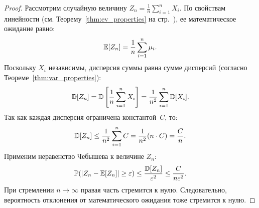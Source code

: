 \begin{proof}
Рассмотрим случайную величину $Z_n = \frac{1}{n}\sum_{i=1}^n X_i$.
По свойствам линейности (см. Теорему~\ref{thm:ev_properties} на стр.~\pageref{thm:ev_properties}), ее математическое ожидание равно:
\[
\mathbb{E}[Z_n] = \frac{1}{n}\sum_{i=1}^n \mu_i.
\]
Поскольку $X_i$ независимы, дисперсия суммы равна сумме дисперсий (согласно Теореме~\ref{thm:var_properties}):
\[
\mathbb{D}[Z_n] = \mathbb{D}\left[\frac{1}{n}\sum_{i=1}^n X_i\right] = \frac{1}{n^2} \sum_{i=1}^n \mathbb{D}[X_i].
\]
Так как каждая дисперсия ограничена константой~$C$, то:
\[
\mathbb{D}[Z_n] \le \frac{1}{n^2} \sum_{i=1}^n C = \frac{1}{n^2} (n \cdot C) = \frac{C}{n}.
\]
Применим неравенство Чебышева к величине $Z_n$:
\[
\mathbb{P}(\lvert Z_n - \mathbb{E}[Z_n]\rvert \ge \varepsilon) \le \frac{\mathbb{D}[Z_n]}{\varepsilon^2} \le \frac{C}{n \varepsilon^2}.
\]
При стремлении $n \to \infty$ правая часть стремится к нулю. Следовательно, вероятность отклонения от математического ожидания тоже стремится к нулю.
\end{proof}